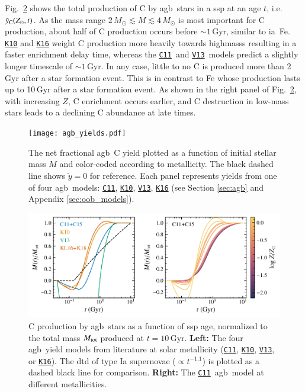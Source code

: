 \documentclass[12pt,oneside,letterpaper]{report}
\newcommand{\agb}{\gls{agb}}
\newcommand{\ia}{\gls{ia}}
\newcommand{\ssp}{\gls{ssp}}
\newcommand{\cxi}{\texttt{\hyperlink{C11}{C11}}}
\newcommand{\kx}{\texttt{\hyperlink{K10}{K10}}}
\newcommand{\kxvi}{\texttt{\hyperlink{K16}{K16}}}
\newcommand{\vxiii}{\texttt{\hyperlink{V13}{V13}}}
\newcommand{\about}[1]{${\sim} #1$}
\begin{document}
Fig.~\ref{fig:agb-ssp} shows the total production of C by \agb\ stars in a \ssp{} at an age $t$, i.e. $\tilde{y}_{\rm C}(Z_\odot, t)$. 
As the mass range $2\,M_\odot\lesssim M \lesssim 4\,M_\odot$ is most important for C production, about half of C production occurs before \about{1}\,Gyr, similar to \ia\ Fe. 
\kx{} and \kxvi{} weight C production more heavily towards \glspl{highmass} resulting in a faster enrichment delay time, whereas the \cxi\ and \vxiii\ models predict a slightly longer timescale of \about{1}\,Gyr. In any case, little to no C is produced more than 2\,Gyr after a star formation event. This is in contrast to Fe whose production lasts up to 10\,Gyr after a star formation event. As shown in the right panel of Fig.~\ref{fig:agb-ssp}, with increasing $Z$, C enrichment occurs earlier, and C destruction in low-mass stars leads to a declining C abundance at late times.
    

\begin{figure}[htp]
    \centering
 	    \texttt{[image: agb\_yields.pdf]}
        \caption[Low-Mass Stellar Carbon Yields]{The net fractional \agb\ C yield  plotted as a function of initial stellar mass $M$ and color-coded according to metallicity. The black dashed line shows $\tilde{y}=0$ for reference. Each panel represents yields from one of four \agb\ models: \cxi, \kx{}, \vxiii{}, \kxvi{} (see Section \ref{sec:agb} and  Appendix \ref{sec:oob_models}). }
        \label{fig:y_agb}
\end{figure}
\begin{figure}[htp]
    \centering
    \includegraphics[scale=1]{y_agb_t2.pdf}

    \caption[Carbon Delay Time Distribution]{
    C production by \agb\ stars as a function of \ssp{} age, normalized to the total mass $M_{\rm tot}$ produced at $t=10$\,Gyr. \textbf{Left:} The four \agb\ yield models from literature at solar metallicity (\cxi, \kx{}, \vxiii{}, or \kxvi{}). The \gls{dtd} of type Ia supernovae ($\propto t^{-1.1}$) is plotted as a dashed black line for comparison. \textbf{Right:} The \cxi\ \agb\ model at different metallicities. }
    \label{fig:agb-ssp}
\end{figure}
\end{document}

